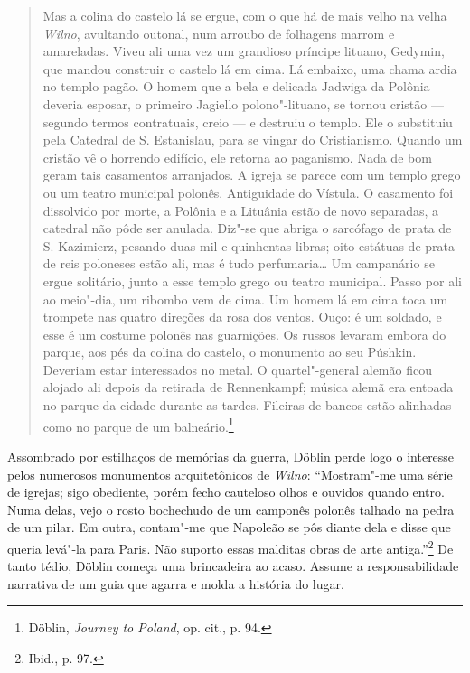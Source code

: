 \begin{quote}
Mas a colina do castelo lá se ergue, com o que há de mais velho na velha
\textit{Wilno}, avultando outonal, num arroubo de folhagens marrom e amareladas.
Viveu ali uma vez um grandioso príncipe lituano, Gedymin, que mandou
construir o castelo lá em cima. Lá embaixo, uma chama ardia no templo
pagão. O homem que a bela e delicada Jadwiga da Polônia deveria esposar,
o primeiro Jagiello polono"-lituano, se tornou cristão --- segundo termos
contratuais, creio --- e destruiu o templo. Ele o substituiu pela Catedral
de S. Estanislau, para se vingar do Cristianismo. Quando um cristão vê o
horrendo edifício, ele retorna ao paganismo. Nada de bom geram tais
casamentos arranjados. A igreja se parece com um templo grego ou um
teatro municipal polonês. Antiguidade do Vístula. O casamento foi
dissolvido por morte, a Polônia e a Lituânia estão de novo separadas, a
catedral não pôde ser anulada. Diz"-se que abriga o sarcófago de prata de
S. Kazimierz, pesando duas mil e quinhentas libras; oito estátuas de
prata de reis poloneses estão ali, mas é tudo perfumaria\ldots{} Um
campanário se ergue solitário, junto a esse templo grego ou teatro
municipal. Passo por ali ao meio"-dia, um ribombo vem de cima. Um homem
lá em cima toca um trompete nas quatro direções da rosa dos ventos.
Ouço: é um soldado, e esse é um costume polonês nas guarnições. Os
russos levaram embora do parque, aos pés da colina do castelo, o
monumento ao seu Púshkin. Deveriam estar interessados no metal. O
quartel"-general alemão ficou alojado ali depois da retirada de
Rennenkampf; música alemã era entoada no parque da cidade durante as
tardes. Fileiras de bancos estão alinhadas como no parque de um
balneário.\footnote{Döblin, \textit{Journey to Poland}, op. cit., p. 94.}
\end{quote}

%

Assombrado por estilhaços de memórias da guerra, Döblin perde logo o
interesse pelos numerosos monumentos arquitetônicos de \textit{Wilno}:
``Mostram"-me uma série de igrejas; sigo obediente, porém fecho cauteloso
olhos e ouvidos quando entro. Numa delas, vejo o rosto bochechudo de um
camponês polonês talhado na pedra de um pilar. Em outra, contam"-me que
Napoleão se pôs diante dela e disse que queria levá"-la para Paris. Não
suporto essas malditas obras de arte antiga.''\footnote{Ibid., p. 97.}
De tanto tédio, Döblin começa uma brincadeira ao acaso. Assume a
responsabilidade narrativa de um guia que agarra e molda a história do
lugar.


